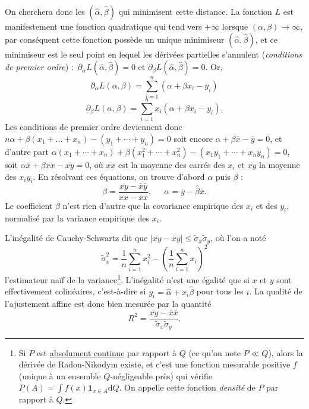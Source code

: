 \documentclass[
  10,
  letterpaper,
  DIV=11,
  numbers=noendperiod]{scrreport}
\theoremstyle{plain}
\theoremstyle{definition}
\theoremstyle{plain}
\theoremstyle{definition}
\theoremstyle{definition}
\theoremstyle{plain}
\theoremstyle{remark}
\begin{document}
On cherchera donc les \((\hat\alpha, \hat\beta)\) qui minimisent cette
distance. La fonction \(L\) est manifestement une fonction quadratique
qui tend vers \(+\infty\) lorsque \((\alpha, \beta) \to \infty\), par
conséquent cette fonction possède un unique minimiseur
\((\hat{\alpha}, \hat{\beta})\), et ce minimiseur est le seul point en
lequel les dérivées partielles s'annulent (\emph{conditions de premier
ordre}) :~\(\partial_\alpha L(\hat{\alpha}, \hat{\beta}) = 0\) et
\(\partial_\beta L(\hat{\alpha}, \hat{\beta})=0\). Or,
\[\partial_\alpha L(\alpha, \beta)  = \sum_{i=1}^n (\alpha + \beta x_i - y_i)\]
\[ \partial_\beta L(\alpha, \beta) = \sum_{i=1}^n x_i(\alpha + \beta x_i - y_i).\]
Les conditions de premier ordre deviennent donc
\(n\alpha + \beta (x_1 + \dotsc + x_n) - (y_1 + \dotsb + y_n) =0\) soit
encore \(\alpha + \beta \bar{x} - \bar{y}=0\), et d'autre part
\(\alpha (x_1 + \dotsb + x_n) + \beta(x_1^2 + \dotsb + x_n^2) - (x_1y_1 + \dotsb + x_ny_n) = 0\),
soit \(\alpha \bar{x}+ \beta \overline{xx} - \overline{xy} = 0\), où
\(\overline{xx}\) est la moyenne des carrés des \(x_i\) et
\(\overline{xy}\) la moyenne des \(x_iy_i\). En résolvant ces équations,
on trouve d'abord \(\alpha\) puis \(\beta\) :~
\[\beta = \frac{\overline{xy}-\bar{x}\bar{y}}{\overline{xx} - \bar{x}\bar{x}} ,~~\quad\alpha = \bar{y} - \hat{\beta}\bar{x}.\]
Le coefficient \(\beta\) n'est rien d'autre que la covariance empirique
des \(x_i\) et des \(y_i\), normalisé par la variance empirique des
\(x_i\).

L'inégalité de Cauchy-Schwartz dit que
\(\left|\overline{xy} - \bar{x}{\bar{y}}\right| \leqslant \tilde{\sigma}_x \tilde{\sigma}_y\),
où l'on a noté
\[\tilde{\sigma}_x^2 = \frac{1}{n}\sum_{i=1}^n x_i^2 - \left(\frac{1}{n}\sum_{i=1}^n x_i\right)^2\]
l'estimateur naïf de la variance\footnote{Si \(P\) est
  \href{https://fr.wikipedia.org/wiki/Th\%C3\%A9or\%C3\%A8me_de_Radon-Nikodym-Lebesgue}{absolument
  continue} par rapport à \(Q\) (ce qu'on note \(P \ll Q\)), alors la
  dérivée de Radon-Nikodym existe, et c'est une fonction mesurable
  positive \(f\) (unique à un ensemble \(Q\)-négligeable près) qui
  vérifie \(P(A) = \int f(x)\mathbf{1}_{x\in A}\mathrm{d}Q\). On appelle
  cette fonction \emph{densité} de \(P\) par rapport à \(Q\).}.
L'inégalité n'est une égalité que si \(x\) et \(y\) sont effectivement
colinéaires, c'est-à-dire si \(y_i = \hat{\alpha} + x_i \hat{\beta}\)
pour tous les \(i\). La qualité de l'ajustement affine est donc bien
mesurée par la quantité
\[ R^2 = \frac{\overline{xy}-\bar{x}\bar{x}}{\tilde{\sigma}_x \tilde{\sigma}_y}.\]
\end{document}
